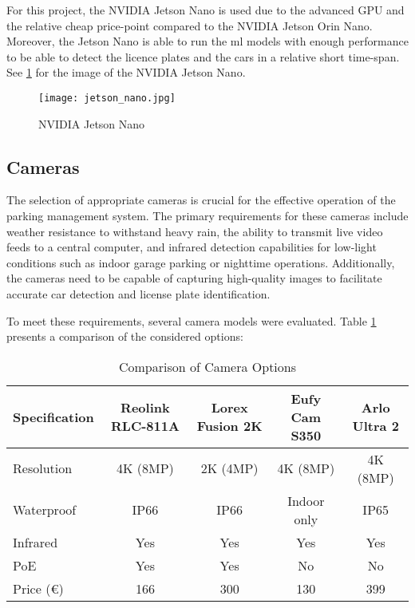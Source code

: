 For this project, the NVIDIA Jetson Nano is used due to the advanced GPU and the relative cheap price-point compared to the NVIDIA Jetson Orin Nano. Moreover, the Jetson Nano is able to run the \gls{ml} models with enough performance to be able to detect the licence plates and the cars in a relative short time-span. See \cref{fig:jetson-nano} for the image of the NVIDIA Jetson Nano.

\begin{figure}
	\texttt{[image: jetson\_nano.jpg]}
	\caption{NVIDIA Jetson Nano}\label{fig:jetson-nano}
\end{figure}

\subsection{Cameras}

The selection of appropriate cameras is crucial for the effective operation of the parking management system. The primary requirements for these cameras include weather resistance to withstand heavy rain, the ability to transmit live video feeds to a central computer, and infrared detection capabilities for low-light conditions such as indoor garage parking or nighttime operations. Additionally, the cameras need to be capable of capturing high-quality images to facilitate accurate car detection and license plate identification.

To meet these requirements, several camera models were evaluated. Table \ref{tab:camera_comparison} presents a comparison of the considered options:

\begin{table}
	\begin{tabular}{|l|c|c|c|c|}
		\hline
		\textbf{Specification} & \textbf{Reolink RLC-811A} & \textbf{Lorex Fusion 2K} & \textbf{Eufy Cam S350} & \textbf{Arlo Ultra 2} \\
		\hline
		Resolution             & 4K (8MP)                  & 2K (4MP)                 & 4K (8MP)               & 4K (8MP)              \\
		\hline
		Waterproof             & IP66                      & IP66                     & Indoor only            & IP65                  \\
		\hline
		Infrared               & Yes                       & Yes                      & Yes                    & Yes                   \\
		\hline
		PoE                    & Yes                       & Yes                      & No                     & No                    \\
		\hline
		Price (\euro)          & 166                       & 300                      & 130                    & 399                   \\
		\hline
	\end{tabular}
	\caption{Comparison of Camera Options}\label{tab:camera_comparison}
\end{table}

